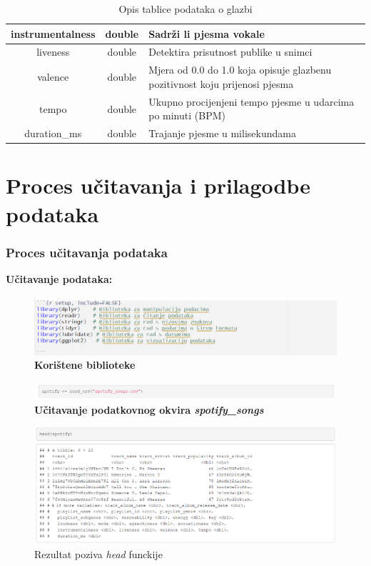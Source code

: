 \begin{table}[h]
\begin{tabular}{|c|c|p{8cm}|}
	instrumentalness & double & Sadrži li pjesma vokale \\ \hline
	liveness & double & Detektira prisutnost publike u snimci \\ \hline
	valence & double & Mjera od 0.0 do 1.0 koja opisuje glazbenu pozitivnost koju prijenosi pjesma \\ \hline
	tempo & double & Ukupno procijenjeni tempo pjesme u udarcima po minuti (BPM) \\ \hline
	duration\_ms & double & Trajanje pjesme u milisekundama \\ \hline
	\end{tabular}
	\caption{Opis tablice podataka o glazbi}
	\label{tab:glazba}
	\end{table}

\clearpage
\section{Proces učitavanja i prilagodbe podataka}

	\subsubsection{Proces učitavanja podataka}
	
		\textbf{Učitavanje podataka:}
		\begin{figure}[H]
			\centering
			\includegraphics[scale=0.7]{slike/ucitavanje.png}
			\caption{\textbf{Korištene biblioteke \textit{}}}
		\end{figure}
		\begin{figure}[H]
			\centering
			\includegraphics[scale=0.7]{slike/spotify.png}
			\caption{\textbf{Učitavanje podatkovnog okvira \textit{spotify\_songs}}}
		\end{figure}
		
		\begin{figure}[H]
			\includegraphics[scale=0.7]{slike/head.png}
			\centering
			\caption{Rezultat poziva \textit{head} funckije}
			
		\end{figure}
		
